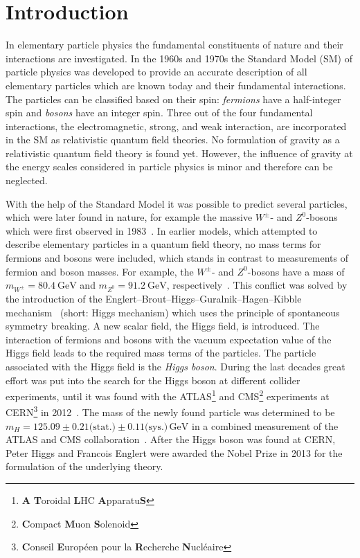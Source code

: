 \chapter{Introduction}\label{cha:introduction}

In elementary particle physics the fundamental constituents of nature and their interactions are investigated.
In the 1960s and 1970s the Standard Model (SM) of particle physics was developed to provide an accurate description of all elementary particles which are known today
and their fundamental interactions.
The particles can be classified based on their spin: \emph{fermions} have a half-integer spin and \emph{bosons} have an integer spin.
Three out of the four fundamental interactions, the electromagnetic, strong, and weak interaction, are incorporated in the SM as
relativistic quantum field theories.
No formulation of gravity as a relativistic quantum field theory is found yet.
However, the influence of gravity at the energy scales considered in particle physics is minor and therefore can be neglected.

With the help of the Standard Model it was possible to predict several particles, which were later found in nature,
for example the massive $W^\pm$- and $Z^0$-bosons which were first observed in 1983~\cite{ZDiscovery,WDiscovery,ZeeDiscovery,WeDiscovery}.
In earlier models, which attempted to describe elementary particles in a quantum field theory,
no mass terms for fermions and bosons were included, which stands in contrast to measurements of fermion and boson masses.
For example, the $W^\pm$- and $Z^0$-bosons have a mass of $m_{W^\pm} = \SI{80.4}{\GeV}$ and $m_{Z^0} = \SI{91.2}{\GeV}$, respectively~\cite{PDG}.
This conflict was solved by the introduction of the
Englert--Brout--Higgs--Guralnik--Hagen--Kibble mechanism~\cite{HiggsMecha1,HiggsMecha2,HiggsMecha3,HiggsMecha4,HiggsMecha5,HiggsMecha6} (short: Higgs mechanism)
which uses the principle of spontaneous symmetry breaking.
A new scalar field, the Higgs field, is introduced.
The interaction of fermions and bosons with the vacuum expectation value of the Higgs field leads to the required mass terms of the particles.
The particle associated with the Higgs field is the \emph{Higgs boson}.
During the last decades great effort was put into the search for the Higgs boson at different collider experiments, until it
was found with the ATLAS\footnote{\textbf{A} \textbf{T}oroidal \textbf{L}HC \textbf{A}pparatu\textbf{S}} and
CMS\footnote{\textbf{C}ompact \textbf{M}uon \textbf{S}olenoid} experiments at
CERN\footnote{\textbf{C}onseil \textbf{E}uropéen pour la \textbf{R}echerche \textbf{N}ucléaire} in 2012~\cite{HiggsDiscoveryATLAS,HiggsDiscoveryCMS}.
The mass of the newly found particle was determined to be $m_H = 125.09 \pm 0.21 \text{(stat.)} \pm 0.11 \text{(sys.)}\,\text{GeV}$
in a combined measurement of the ATLAS and CMS collaboration~\cite{MassCombinedMeas}.
After the Higgs boson was found at CERN, Peter Higgs and Francois Englert were awarded the Nobel Prize in 2013 for the formulation of
the underlying theory.

